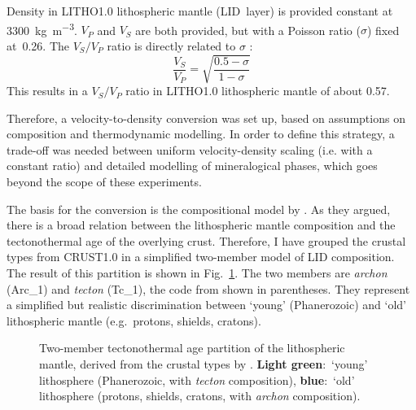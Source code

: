 Density in {LITHO1.0} \parencite{Pasyanos2014} lithospheric mantle ({LID}~layer) is provided constant at \SI{3300}{\kilo \gram \per \cubic \metre}.
$V_P$ and $V_S$ are both provided, but with a Poisson ratio ($\sigma$) fixed at~\num{0.26}.
The $V_S / V_P$ ratio is directly related to $\sigma$ \parencite{Sheriff2002}:
\begin{equation}
    \label{eq:VSVP_PoissonRatio}
    \frac{V_S}{V_P} =
    \sqrt{\frac{0.5 - \sigma}{1 - \sigma}}
\end{equation}
This results in a $V_S / V_P$ ratio in {LITHO1.0} lithospheric mantle of about \num{0.57}.

Therefore, a velocity-to-density conversion was set up, based on assumptions on composition and thermodynamic modelling.
In order to define this strategy, a trade-off was needed between uniform velocity-density scaling (i.e. with a constant ratio) and detailed modelling of mineralogical phases, which goes beyond the scope of these experiments.

The basis for the conversion is the compositional model by \textcite{Griffin2009}.
As they argued, there is a broad relation between the lithospheric mantle composition and the tectonothermal age of the overlying crust.
Therefore, I have grouped the crustal types from {CRUST1.0} \parencite{Laske2012Crust10} in a simplified two-member model of LID composition.
The result of this partition is shown in Fig.~\ref{fig:SigIs:LithoAges}.
The two members are \textit{archon} (Arc\_1) and \textit{tecton} (Tc\_1), the code from \textcite{Griffin2009} shown in parentheses.
They represent a simplified but realistic discrimination between `young' (Phanerozoic) and `old' lithospheric mantle (e.g.~protons, shields, cratons).

\begin{figure}
    \begin{adjustbox}{center}
    \end{adjustbox}
    \caption[Tectonothermal age partition of the lithospheric mantle.]{
        Two-member tectonothermal age partition of the lithospheric mantle, derived from the crustal types by \textcite{Laske2012Crust10}.
        \textbf{Light green}:~`young' lithosphere (Phanerozoic, with \textit{tecton} composition), \textbf{blue}:~`old' lithosphere (protons, shields, cratons, with \textit{archon} composition).
    }
    \label{fig:SigIs:LithoAges}
\end{figure}

